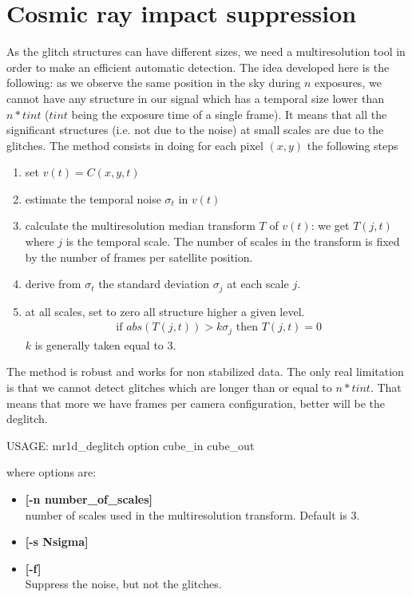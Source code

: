 \section{Cosmic ray impact suppression}
As the glitch structures can have different sizes, we need a multiresolution
tool in order to make an efficient automatic detection. The idea developed here is the following: as we observe 
the same position in the sky during $n$ exposures, we cannot have any structure in our signal 
which has a temporal size lower than $n*tint$ ($tint$ being the exposure time 
of a single frame). It means that all the 
significant structures (i.e. not due to the noise) at small scales
are due to the glitches.
The method consists in doing for each pixel $(x,y)$ the following steps
\begin{enumerate}
\item set $v(t) = C(x,y,t)$
\item estimate the temporal noise $\sigma_t$ in $v(t)$
\item calculate the multiresolution median transform  $T$ of $v(t)$: we get $T(j, t)$ where $j$ is the 
temporal scale. The number of scales in the transform is fixed by the
number of frames per satellite position.
\item derive from $\sigma_t$ the standard deviation $\sigma_j$ at each scale $j$.
\item at all scales, set to zero all structure higher a given level.
\begin{eqnarray}
\mbox{ if } abs(T(j, t)) > k \sigma_j \mbox{ then } T(j, t) = 0
\end{eqnarray}
$k$ is generally taken equal to 3.
\end{enumerate}
The method is robust and works for non stabilized data. The only real limitation is that we 
cannot detect glitches which are longer than or equal to $n*tint$. That
means that more we have frames per camera configuration, better will be the deglitch. 

\begin{center}
 USAGE: mr1d\_deglitch option cube\_in cube\_out
\end{center}
where options are:
\begin{itemize}
\item {\bf [-n number\_of\_scales]} \\
number of scales used in the multiresolution transform. Default is 3.
\item {\bf [-s Nsigma]} \\
\item {\bf [-f]} \\
Suppress the noise, but not the glitches.
\end{itemize}

